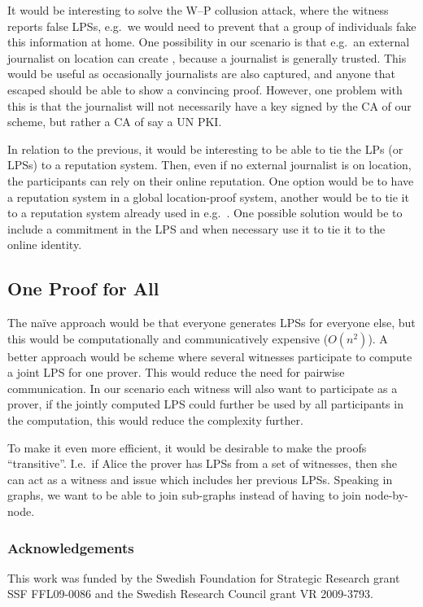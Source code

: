 It would be interesting to solve the W--P collusion attack, where the witness 
reports false \acp{LPS}, e.g.\ we would need to prevent that a group of 
individuals fake this information at home.
One possibility in our scenario is that e.g.\ an external journalist on 
location can create , because a journalist is generally trusted.
This would be useful as occasionally journalists are also captured, and anyone 
that escaped should be able to show a convincing proof.
However, one problem with this is that the journalist will not necessarily have 
a key signed by the \ac{CA} of our scheme, but rather a \ac{CA} of say a UN 
\ac{PKI}.

In relation to the previous, it would be interesting to be able to tie the 
\acp{LP} (or \acp{LPS}) to a reputation system.
Then, even if no external journalist is on location, the participants can rely 
on their online reputation.
One option would be to have a reputation system in a global location-proof 
system, another would be to tie it to a reputation system already used in e.g.\ 
.
One possible solution would be to include a commitment in the \ac{LPS} and when 
necessary use it to tie it to the online identity.

\subsection{One Proof for All}

The naïve approach would be that everyone generates \acp{LPS} for everyone 
else, but this would be computationally and communicatively expensive 
(\(O(n^2)\)).
A better approach would be  scheme where several witnesses participate 
to compute a joint \ac{LPS} for one prover.
This would reduce the need for pairwise communication.
In our scenario each witness will also want to participate as a prover, if the 
jointly computed \ac{LPS} could further be used by all participants in the 
computation, this would reduce the complexity further.

To make it even more efficient, it would be desirable to make the proofs 
\enquote{transitive}.
I.e.\ if Alice the prover has \acp{LPS} from a set of witnesses, then she can 
act as a witness and issue \iac{LPS} which includes her previous \acp{LPS}.
Speaking in graphs, we want to be able to join sub-graphs instead of having to 
join node-by-node.


\subsubsection*{Acknowledgements}

This work was funded by the Swedish Foundation for Strategic Research grant SSF 
FFL09-0086 and the Swedish Research Council grant VR 2009-3793.


\printbibliography{}
